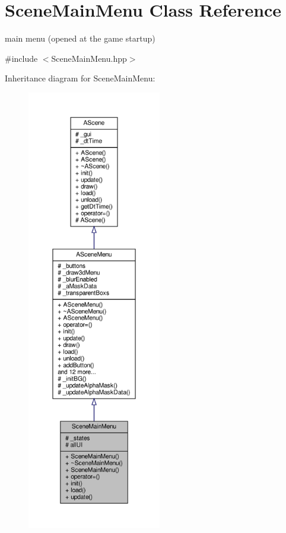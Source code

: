 \hypertarget{class_scene_main_menu}{}\section{Scene\+Main\+Menu Class Reference}
\label{class_scene_main_menu}


main menu (opened at the game startup)  




{\ttfamily \#include $<$Scene\+Main\+Menu.\+hpp$>$}



Inheritance diagram for Scene\+Main\+Menu\+:
\nopagebreak
\begin{figure}[H]
\begin{center}
\leavevmode
\includegraphics[height=550pt]{class_scene_main_menu__inherit__graph}
\end{center}
\end{figure}


